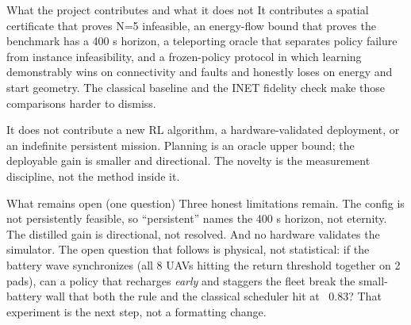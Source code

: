 \documentclass[aspectratio=169,10pt]{beamer}
\begin{document}
\begin{frame}{What the project contributes and what it does not}
  \small
  It contributes a spatial certificate that proves N=5 infeasible, an energy-flow bound that proves the benchmark has a 400 s horizon, a teleporting oracle that separates policy failure from instance infeasibility, and a frozen-policy protocol in which learning demonstrably wins on connectivity and faults and honestly loses on energy and start geometry. The classical baseline and the INET fidelity check make those comparisons harder to dismiss.
  \vspace{0.2cm}

  It does not contribute a new RL algorithm, a hardware-validated deployment, or an indefinite persistent mission. Planning is an oracle upper bound; the deployable gain is smaller and directional. The novelty is the measurement discipline, not the method inside it.
\end{frame}

\begin{frame}{What remains open (one question)}
  \small
  Three honest limitations remain. The config is not persistently feasible, so ``persistent'' names the 400 s horizon, not eternity. The distilled gain is directional, not resolved. And no hardware validates the simulator. The open question that follows is physical, not statistical: if the battery wave synchronizes (all 8 UAVs hitting the return threshold together on 2 pads), can a policy that recharges \emph{early} and staggers the fleet break the small-battery wall that both the rule and the classical scheduler hit at ~0.83? That experiment is the next step, not a formatting change.
\end{frame}
\end{document}
